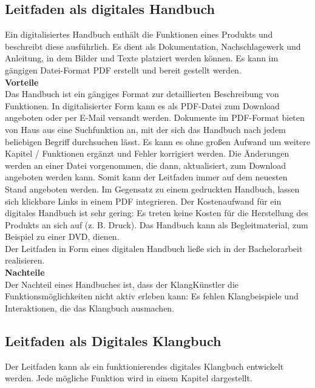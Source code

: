 
\subsection{Leitfaden als digitales Handbuch}
Ein digitalisiertes Handbuch enthält die Funktionen eines Produkts und beschreibt diese ausführlich. Es dient als Dokumentation, Nachschlagewerk und Anleitung, in dem Bilder und Texte platziert werden können. Es kann im gängigen Datei-Format PDF erstellt und bereit gestellt werden.\\


\textbf{Vorteile}\\
Das Handbuch ist ein gängiges Format zur detaillierten Beschreibung von Funktionen. In digitalisierter Form kann es als PDF-Datei zum Download angeboten oder per E-Mail versandt werden. Dokumente im PDF-Format bieten von Haus aus eine Suchfunktion an, mit der sich das Handbuch nach jedem beliebigen Begriff durchsuchen lässt. Es kann es ohne großen Aufwand um weitere Kapitel / Funktionen ergänzt und Fehler korrigiert werden. Die Änderungen werden an einer Datei vorgenommen, die dann, aktualisiert, zum Download angeboten werden kann. Somit kann der Leitfaden immer auf dem neuesten Stand angeboten werden. Im Gegensatz zu einem gedruckten Handbuch, lassen sich klickbare Links in einem PDF integrieren. Der Kostenaufwand für ein digitales Handbuch ist sehr gering: Es treten keine Kosten für die Herstellung des Produkts an sich auf (z. B. Druck). Das Handbuch kann als Begleitmaterial, zum Beispiel zu einer DVD, dienen. \\Der Leitfaden in Form eines digitalen Handbuch ließe sich in der Bachelorarbeit realisieren.\\

\textbf{Nachteile}\\
Der Nachteil eines Handbuches ist, dass der KlangKünstler die Funktionsmöglichkeiten nicht aktiv erleben kann: Es fehlen Klangbeispiele und Interaktionen, die das Klangbuch ausmachen. 




\subsection{Leitfaden als Digitales Klangbuch}
Der Leitfaden kann als ein funktionierendes digitales Klangbuch entwickelt werden. Jede mögliche Funktion wird in einem Kapitel dargestellt.\\

